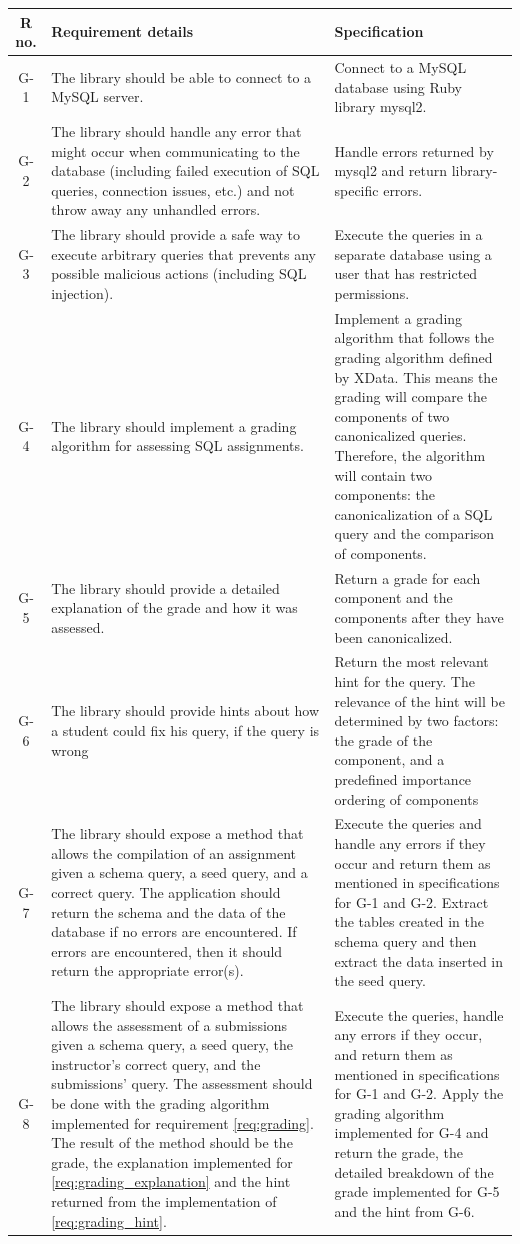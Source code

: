 \begin{tabularx}{\textwidth}{|c|Y|Y|}
  \hline
  \textbf{R no.} & \textbf{Requirement details} & \textbf{Specification} \\\hline
  \endhead
G-1 & The library should be able to connect to a MySQL server. & Connect to a MySQL database using Ruby library mysql2. \\\hline
G-2 & The library should handle any error that might occur when communicating to the database (including failed execution of SQL queries, connection issues, etc.) and not throw away any unhandled errors. & Handle errors returned by mysql2 and return library-specific errors. \\\hline
G-3 & The library should provide a safe way to execute arbitrary queries that prevents any possible malicious actions (including SQL injection). & Execute the queries in a separate database using a user that has restricted permissions. \\\hline
G-4 & The library should implement a grading algorithm for assessing SQL assignments. & Implement a grading algorithm that follows the grading algorithm defined by XData. This means the grading will compare the components of two canonicalized queries. Therefore, the algorithm will contain two components: the canonicalization of a SQL query and the comparison of components. \\\hline
G-5 & The library should provide a detailed explanation of the grade and how it was assessed. & Return a grade for each component and the components after they have been canonicalized. \\\hline
G-6 & The library should provide hints about how a student could fix his query, if the query is wrong & Return the most relevant hint for the query. The relevance of the hint will be determined by two factors: the grade of the component, and a predefined importance ordering of components\\\hline
G-7 & The library should expose a method that allows the compilation of an assignment given a schema query, a seed query, and a correct query. The application should return the schema and the data of the database if no errors are encountered. If errors are encountered, then it should return the appropriate error(s). & Execute the queries and handle any errors if they occur and return them as mentioned in specifications for G-1 and G-2. Extract the tables created in the schema query and then extract the data inserted in the seed query. \\\hline
G-8 & The library should expose a method that allows the assessment of a submissions given a schema query, a seed query, the instructor's correct query, and the submissions' query.  The assessment should be done with the grading algorithm implemented for requirement \ref{req:grading}. The result of the method should be the grade, the explanation implemented for \ref{req:grading_explanation} and the hint returned from the implementation of \ref{req:grading_hint}. & Execute the queries, handle any errors if they occur, and return them as mentioned in specifications for G-1 and G-2. Apply the grading algorithm implemented for G-4 and return the grade, the detailed breakdown of the grade implemented for G-5 and the hint from G-6. \\\hline
\end{tabularx}
